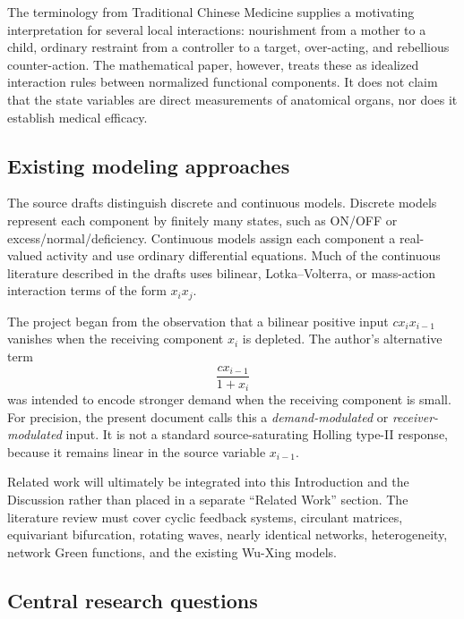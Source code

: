 \documentclass[11pt, reqno]{amsart}
\theoremstyle{definition}
\theoremstyle{remark}
\begin{document}
	The terminology from Traditional Chinese Medicine supplies a motivating
	interpretation for several local interactions: nourishment from a mother to a
	child, ordinary restraint from a controller to a target, over-acting, and
	rebellious counter-action.  The mathematical paper, however, treats these as
	idealized interaction rules between normalized functional components.  It does
	not claim that the state variables are direct measurements of anatomical
	organs, nor does it establish medical efficacy.
	
	\subsection{Existing modeling approaches}
	
	The source drafts distinguish discrete and continuous models.  Discrete models
	represent each component by finitely many states, such as ON/OFF or
	excess/normal/deficiency.  Continuous models assign each component a
	real-valued activity and use ordinary differential equations.  Much of the
	continuous literature described in the drafts uses bilinear, Lotka--Volterra,
	or mass-action interaction terms of the form $x_i x_j$.
	
	The project began from the observation that a bilinear positive input
	$c x_i x_{i-1}$ vanishes when the receiving component $x_i$ is depleted.  The
	author's alternative term
	\[
	\frac{c x_{i-1}}{1+x_i}
	\]
	was intended to encode stronger demand when the receiving component is small.
	For precision, the present document calls this a \emph{demand-modulated} or
	\emph{receiver-modulated} input.  It is not a standard source-saturating
	Holling type-II response, because it remains linear in the source variable
	$x_{i-1}$.
	
	Related work will ultimately be integrated into this Introduction and the
	Discussion rather than placed in a separate ``Related Work'' section.  The
	literature review must cover cyclic feedback systems, circulant matrices,
	equivariant bifurcation, rotating waves, nearly identical networks,
	heterogeneity, network Green functions, and the existing Wu-Xing models.
	
	
	\subsection{Central research questions}
	
\end{document}
